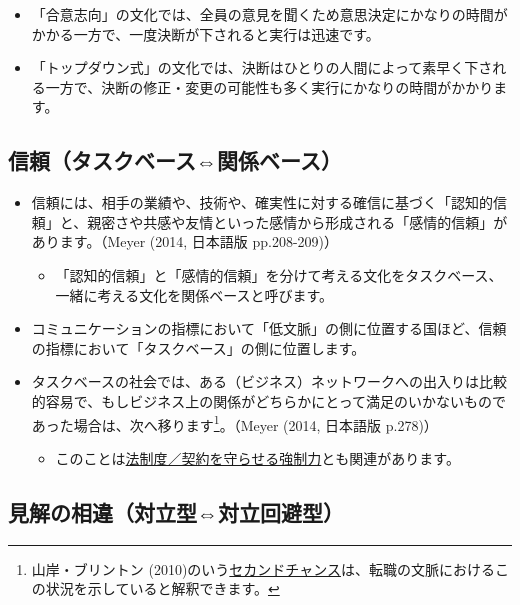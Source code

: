 \documentclass[
]{book}
\providecommand{\tightlist}{%
  \setlength{\itemsep}{0pt}\setlength{\parskip}{0pt}}
\begin{document}
\begin{itemize}
\item
  「合意志向」の文化では、全員の意見を聞くため意思決定にかなりの時間がかかる一方で、一度決断が下されると実行は迅速です。
\item
  「トップダウン式」の文化では、決断はひとりの人間によって素早く下される一方で、決断の修正・変更の可能性も多く実行にかなりの時間がかかります。
\end{itemize}

\hypertarget{ux4fe1ux983cux30bfux30b9ux30afux30d9ux30fcux30b9ux95a2ux4fc2ux30d9ux30fcux30b9}{%
\subsection{信頼（タスクベース⇔関係ベース）}\label{ux4fe1ux983cux30bfux30b9ux30afux30d9ux30fcux30b9ux95a2ux4fc2ux30d9ux30fcux30b9}}

\begin{itemize}
\item
  信頼には、相手の業績や、技術や、確実性に対する確信に基づく「認知的信頼」と、親密さや共感や友情といった感情から形成される「感情的信頼」があります。（Meyer (2014, 日本語版 pp.208-209)）

  \begin{itemize}
  \tightlist
  \item
    「認知的信頼」と「感情的信頼」を分けて考える文化をタスクベース、一緒に考える文化を関係ベースと呼びます。
  \end{itemize}
\item
  コミュニケーションの指標において「低文脈」の側に位置する国ほど、信頼の指標において「タスクベース」の側に位置します。
\item
  タスクベースの社会では、ある（ビジネス）ネットワークへの出入りは比較的容易で、もしビジネス上の関係がどちらかにとって満足のいかないものであった場合は、次へ移ります\footnote{山岸・ブリントン (2010)のいう\protect\hyperlink{labor}{セカンドチャンス}は、転職の文脈におけるこの状況を示していると解釈できます。}。（Meyer (2014, 日本語版 p.278)）

  \begin{itemize}
  \tightlist
  \item
    このことは\protect\hyperlink{law}{法制度／契約を守らせる強制力}とも関連があります。
  \end{itemize}
\end{itemize}

\hypertarget{ux898bux89e3ux306eux76f8ux9055ux5bfeux7acbux578bux5bfeux7acbux56deux907fux578b}{%
\subsection{見解の相違（対立型⇔対立回避型）}\label{ux898bux89e3ux306eux76f8ux9055ux5bfeux7acbux578bux5bfeux7acbux56deux907fux578b}}
\end{document}
